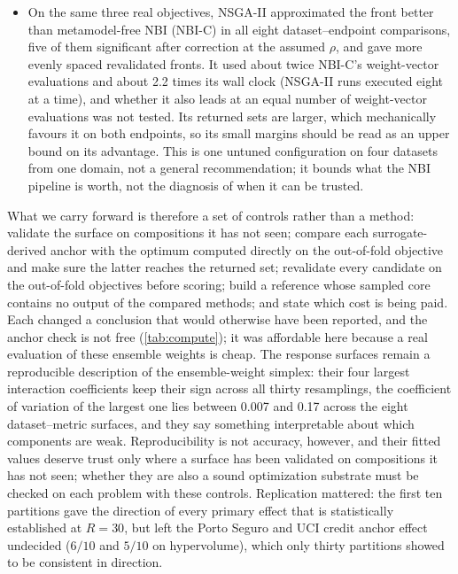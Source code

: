 \begin{itemize}
six candidate sets in 8 to 24 of 30 partitions, and several paired conclusions, including the UCI credit anchor
effect, reverse between them. Sets optimized on the linear relaxation omit the cheapest supports that the unoptimized
design contains, at a penalty whose size depends on the cost range that sets the normalization box. A post hoc check
from the stored samples found the step-cost reference less converged than the weighted-cost one, so part of that
disagreement may be reference instability.
\item On the same three real objectives, NSGA-II approximated the front better than metamodel-free NBI (NBI-C) in all
eight dataset--endpoint comparisons, five of them significant after correction at the assumed $\rho$, and gave more evenly spaced
revalidated fronts. It used about twice NBI-C's weight-vector evaluations and about 2.2 times its wall clock (NSGA-II
runs executed eight at a time), and whether it also leads at an equal number of weight-vector evaluations was not
tested. Its returned sets are larger, which mechanically favours it on both endpoints, so its small margins should be
read as an upper bound on its advantage. This is one untuned configuration on four datasets from one domain, not a
general recommendation; it bounds what the NBI pipeline is worth, not the diagnosis of when it can be trusted.
\end{itemize}

What we carry forward is therefore a set of controls rather than a method: validate the surface on compositions it
has not seen; compare each surrogate-derived anchor with the optimum computed directly on the out-of-fold objective
and make sure the latter reaches the returned set; revalidate every candidate on the out-of-fold objectives before
scoring; build a reference whose sampled core contains no output of the compared methods; and state which cost is
being paid. Each changed a conclusion that would otherwise have been reported, and the anchor check is not free
(\cref{tab:compute}); it was affordable here because a real evaluation of these ensemble weights is cheap. The response surfaces remain a reproducible description of the ensemble-weight simplex: their
four largest interaction coefficients keep their sign across all thirty resamplings, the coefficient of variation of
the largest one lies between 0.007 and 0.17 across the eight dataset--metric surfaces, and they say something
interpretable about which components are weak. Reproducibility is not accuracy, however, and their fitted values
deserve trust only where a surface has been validated on compositions it has not seen; whether they are also a sound
optimization substrate must be checked on each problem with these controls. Replication mattered: the first ten
partitions gave the direction of every primary effect that is statistically established at $R = 30$, but left the
Porto Seguro and UCI credit anchor effect undecided ($6/10$ and $5/10$ on hypervolume), which only thirty partitions
showed to be consistent in direction.